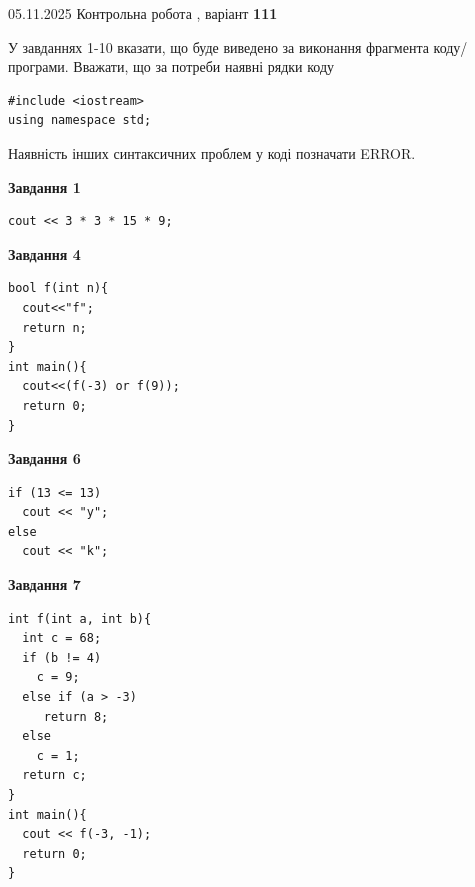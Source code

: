 \documentclass[12pt, ukrainian]{article}
\begin{document}
{\Large{05.11.2025 Контрольна робота , варіант  \No \textbf { 111 }\par}}
{
\begin {large}
У завданнях 1-10 вказати, що буде виведено за виконання фрагмента коду/про\-гра\-ми.
Вважати, що за потреби наявні рядки коду
\begin{verbatim}
#include <iostream>
using namespace std;
\end{verbatim}
Наявність інших синтаксичних проблем у коді позначати ERROR.

\begin{minipage}[t]{7.0cm}

\begin{center}
\textbf{Завдання 1}
\end{center}
\vspace{-8mm}

\begin{verbatim}
cout << 3 * 3 * 15 * 9;
\end{verbatim}



\begin{center}
\textbf{Завдання 4}
\end{center}
\vspace{-8mm}

\begin{verbatim}
bool f(int n){
  cout<<"f";
  return n;
}
int main(){
  cout<<(f(-3) or f(9));
  return 0;
}
\end{verbatim}



\begin{center}
\textbf{Завдання 6}
\end{center}
\vspace{-8mm}

\begin{verbatim}
if (13 <= 13)
  cout << "y";
else
  cout << "k";
\end{verbatim}



\begin{center}
\textbf{Завдання 7}
\end{center}
\vspace{-8mm}

\begin{verbatim}
int f(int a, int b){
  int c = 68;
  if (b != 4)
    c = 9;
  else if (a > -3)
     return 8;
  else
    c = 1;
  return c;
}
int main(){
  cout << f(-3, -1);
  return 0;
}
\end{verbatim}


\end{minipage}
\end{large}}
\end{document}

